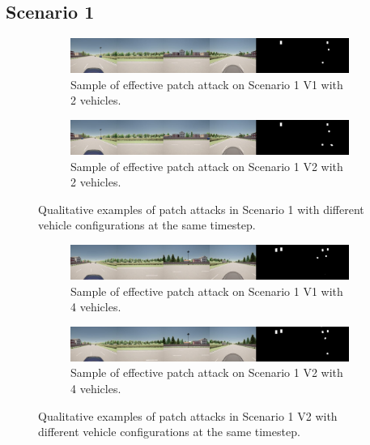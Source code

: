 \subsection{Scenario 1}
\begin{figure}[H]
    \centering
    \begin{subfigure}[b]{1\textwidth}
        \centering
        \includegraphics[width=\textwidth]{figures/results/scenario1v12vh.jpg}
        \caption{Sample of effective patch attack on Scenario 1 V1 with 2 vehicles.}
        \label{fig:scenario1_2vh}
    \end{subfigure}
    \vspace{0.5cm}
    \begin{subfigure}[b]{1\textwidth}
        \centering
        \includegraphics[width=\textwidth]{figures/results/scenario1v22vh.jpg}
        \caption{Sample of effective patch attack on Scenario 1 V2 with 2 vehicles.}
        \label{fig:scenario1_2vh}
    \end{subfigure}
    \caption{Qualitative examples of patch attacks in Scenario 1 with different vehicle configurations at the same timestep.}
    \label{fig:qualitative_results}
\end{figure}

\begin{figure}[H]
    \centering
    \begin{subfigure}[b]{1\textwidth}
        \centering
        \includegraphics[width=\textwidth]{figures/results/scenario1v14vh.jpg}
        \caption{Sample of effective patch attack on Scenario 1 V1 with 4 vehicles.}
        \label{fig:scenario1_2vh}
    \end{subfigure}
    \vspace{0.5cm}
    \begin{subfigure}[b]{1\textwidth}
        \centering
        \includegraphics[width=\textwidth]{figures/results/scenario1v24vh.jpg}
        \caption{Sample of effective patch attack on Scenario 1 V2 with 4 vehicles.}
        \label{fig:scenario1_4vh}
    \end{subfigure}
    \caption{Qualitative examples of patch attacks in Scenario 1 V2 with different vehicle configurations at the same timestep.}
\end{figure}

